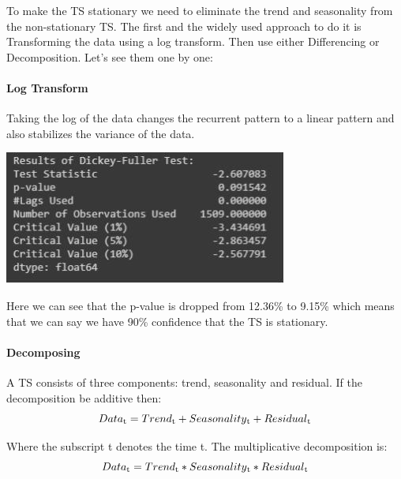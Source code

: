 		To make the TS stationary we need to eliminate the trend and seasonality from the non-stationary TS. The first and the widely used approach to do it is Transforming the data using a log transform. Then use either Differencing or Decomposition. Let’s see them one by one:

		\paragraph{Log Transform}
			Taking the log of the data changes the recurrent pattern to a linear pattern and also stabilizes the variance of the data.

		\begin{center}
		\includegraphics[width=\linewidth]{figures/DF-Test-Results-for-log-transformed-Closing-price.jpg}	
		\label{fig: DF Test Results for log-transformed Closing Price}
		\end{center}

			Here we can see that the p-value is dropped from 12.36\% to 9.15\% which means that we can say we have 90\% confidence that the TS is stationary.

		\paragraph{Decomposing}

			A TS consists of three components: trend, seasonality and residual. If the decomposition be additive then:
				\begin{equation}
					Data\textsubscript{t} = Trend\textsubscript{t} + Seasonality\textsubscript{t} + Residual\textsubscript{t}  
				\end{equation}
				


			Where the subscript t denotes the time t.
			The multiplicative decomposition is:
				\begin{equation}
					Data\textsubscript{t} = Trend\textsubscript{t} * Seasonality\textsubscript{t} * Residual\textsubscript{t} 
				\end{equation}
				

